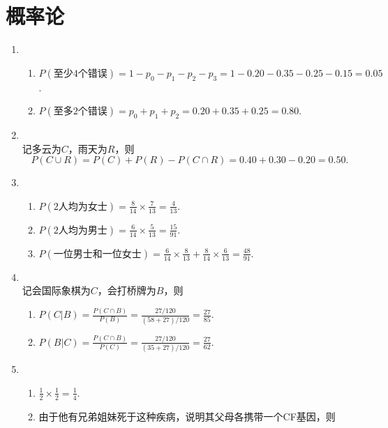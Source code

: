 \section{概率论}
\begin{enumerate}[label=\arabic{section}.\arabic*]
    \item \sol
    \begin{enumerate}[label=\alph*)]
        \item $P(\text{至少4个错误})=1-p_0-p_1-p_2-p_3=1-0.20-0.35-0.25-0.15=0.05$.
        \item $P(\text{至多2个错误})=p_0+p_1+p_2=0.20+0.35+0.25=0.80$.
    \end{enumerate}
    \item \sol\\
    记多云为$C$，雨天为$R$，则
    \[P(C \cup R) = P(C) + P(R) - P(C \cap R)=0.40 + 0.30 - 0.20 = 0.50.\]
    \item \sol
    \begin{enumerate}[label=\alph*)]
        \item $\displaystyle P(\text{2人均为女士})=\frac{8}{14}\times\frac{7}{13}=\frac{4}{13}$.
        \item $\displaystyle P(\text{2人均为男士})=\frac{6}{14}\times\frac{5}{13}=\frac{15}{91}$.
        \item $\displaystyle P(\text{一位男士和一位女士})=\frac{6}{14}\times\frac{8}{13}+\frac{8}{14}\times\frac{6}{13}=\frac{48}{91}$.
    \end{enumerate}
    \item \sol\\
    记会国际象棋为$C$，会打桥牌为$B$，则
    \begin{enumerate}[label=\alph*)]
        \item $\displaystyle P(C|B)=\frac{P(C \cap B)}{P(B)}=\frac{27/120}{(58+27)/120}=\frac{27}{85}$.
        \item $\displaystyle P(B|C)=\frac{P(C \cap B)}{P(C)}=\frac{27/120}{(35+27)/120}=\frac{27}{62}$.
    \end{enumerate}
    \item \sol {\kaishu \textcolor{blue}{注意：b)问由于翻译原因，容易理解为并列关系，但根据英文原文，应该理解为在没有发病的条件下，求携带一个CF基因的条件概率.}}
    \begin{enumerate}[label=\alph*)]
        \item $\displaystyle \frac{1}{2}\times\frac{1}{2}=\frac{1}{4}$.
        \item 由于他有兄弟姐妹死于这种疾病，说明其父母各携带一个CF基因，则

\end{enumerate}
\end{enumerate}
